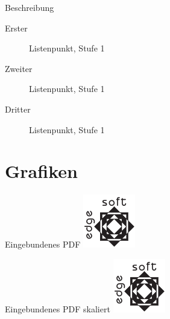 \documentclass[t, aspectratio=169, ngerman]{beamer}
\begin{document}
	\begin{frame}{Beschreibung}
		\begin{description}
			\item[Erster] Listenpunkt, Stufe 1
			\item[Zweiter] Listenpunkt, Stufe 1
			\item[Dritter] Listenpunkt, Stufe 1
		\end{description}
	\end{frame}

	\section{Grafiken}

	\begin{frame}{Eingebundenes PDF}
		\includegraphics{testlogo}
	\end{frame}

	\begin{frame}{Eingebundenes PDF skaliert}
		\includegraphics[width=\textwidth]{testlogo}
	\end{frame}
\end{document}
